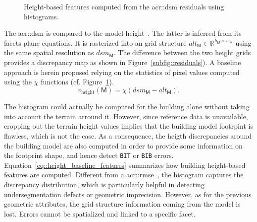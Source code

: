         \begin{figure}[htb]
            \centering
            
            \caption{
                \label{fig::height_baseline_features}
                Height-based features computed from the \gls{acr::dsm} residuals using histograms.
            }
        \end{figure}

        The \gls{acr::dsm} is compared to the model height~\parencite{bredif20073d,zebedin2008fusion}.
        The latter is inferred from its facets plane equations.
        It is rasterized into an grid structure $alt_{\mathsf{M}} \in \mathbb{R}^{h_{\mathsf{M}} \times w_{\mathsf{M}}}$ using the same spatial resolution as $dsm_{\mathsf{M}}$.
        The difference between the two height grids provides a discrepancy map as shown in Figure~\ref{subfig::residuals}).
        A baseline approach is herein proposed relying on the statistics of pixel values computed using the $\chi$ functions (cf. Figure~\ref{fig::height_baseline_features}).\\

        \begin{equation}
            \label{eq::height_baseline_features}
            v_{\text{height}}\left(\mathsf{M}\right) = \chi \left( dsm_{\mathsf{M}} - alt_{\mathsf{M}} \right).
        \end{equation}

        The histogram could actually be computed for the building alone without taking into account the terrain arround it.
        However, since reference data is unavailable, cropping out the terrain height values implies that the building model footrpint is flawless, which is not the case.
        As a consequence, the heigth discrepancies around the building model are also computed in order to provide some information on the footprint shape, and hence detect \texttt{BIT} or \texttt{BIB} errors.\\

        Equation~\ref{eq::height_baseline_features} summarizes how building height-based features are computed.
        Different from a \gls{acr::rmse}~\parencite{lafarge2012creating,poullis2013framework}, the histogram captures the discrepancy distribution, which is particularly helpful in detecting undersegmentation defects or geometric imprecision.
        However, as for the previous geometric attributes, the grid structure information coming from the model is lost.
        Errors cannot be spatialized and linked to a specific facet.


